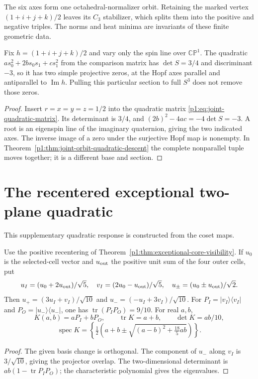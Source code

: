 \documentclass[11pt]{article}
\begin{document}
The six axes form one octahedral-normalizer orbit.  Retaining the
marked vertex \((1+i+j+k)/2\) leaves its \(C_3\) stabilizer, which
splits them into the positive and negative triples. The norms and heat
minima are invariants of these finite geometric data.

\begin{proposition}
\label{p1:prop:fixed-axis-quadratic-zeros}
Fix \(h=(1+i+j+k)/2\) and vary only the spin line over
\(\mathbb{CP}^1\).  The quadratic
\(a s_0^2+2b s_0s_1+c s_1^2\) from the comparison matrix has
\(\det S=3/4\) and discriminant \(-3\), so it has two simple
projective zeros, at the Hopf axes parallel and antiparallel to
\(\operatorname{Im}h\).  Pulling this particular section to full
\(S^3\) does not remove those zeros.
\end{proposition}
\begin{proof}
Insert \(r=x=y=z=1/2\) into the quadratic matrix
\eqref{p1:eq:joint-quadratic-matrix}.  Its determinant is \(3/4\),
and \((2b)^2-4ac=-4\det S=-3\).  A root is an eigenspin line
of the imaginary quaternion, giving the two indicated axes.
The inverse image of a zero under the surjective Hopf map is nonempty.
In Theorem~\ref{p1:thm:joint-orbit-quadratic-descent} the complete
nonparallel tuple moves together; it is a different base and section.
\end{proof}



\section{The recentered exceptional two-plane quadratic}
\label{p1:app:v179-exceptional-two-plane}

This supplementary quadratic response is constructed from the coset maps.

\begin{proposition}
\label{p1:prop:v179-exceptional-quadratic-pencil}
Use the positive recentering of
Theorem~\ref{p1:thm:exceptional-core-visibility}.  If \(u_0\) is the
selected-cell vector and \(u_{\rm out}\) the positive unit sum of the
four outer cells, put
\[
 u_I=(u_0+2u_{\rm out})/\sqrt5,\quad
 v_I=(2u_0-u_{\rm out})/\sqrt5,\quad
 u_\pm=(u_0\pm u_{\rm out})/\sqrt2 .
\]
Then \(u_+=(3u_I+v_I)/\sqrt{10}\) and
\(u_-=(-u_I+3v_I)/\sqrt{10}\).
For \(P_I=|v_I\rangle\langle v_I|\) and
\(P_O=|u_-\rangle\langle u_-|\), one has
\(\operatorname{tr}(P_IP_O)=9/10\).  For real \(a,b\),
\[
 K(a,b)=aP_I+bP_O,\qquad
 \operatorname{tr}K=a+b,\qquad \det K=ab/10,
\]
\[
 \operatorname{spec}K=
 \left\{\tfrac12\left(a+b\pm
       \sqrt{(a-b)^2+\tfrac{18}{5}ab}\right)\right\}.
\]
\end{proposition}
\begin{proof}
The given basis change is orthogonal.  The component of \(u_-\) along
\(v_I\) is \(3/\sqrt{10}\), giving the projector overlap.
The two-dimensional determinant is \(ab(1-\operatorname{tr}P_IP_O)\);
the characteristic polynomial gives the eigenvalues.
\end{proof}
\end{document}
